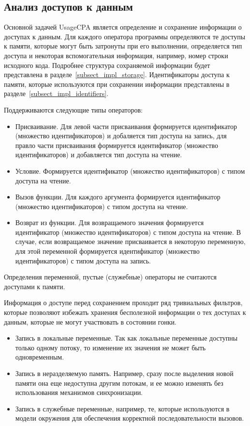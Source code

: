 \subsection{Анализ доступов к данным}
Основной задачей UsageCPA является определение и сохранение информации о доступах к данным. 
Для каждого оператора программы определяются те доступы к памяти, которые могут быть затронуты при его выполнении, определяется тип доступа и некоторая вспомогательная информация, например, номер строки исходного кода.
Подробнее структура сохраняемой информации будет представлена в разделе~\ref{subsect_impl_storage}.
Идентификаторы доступа к памяти, которые используются при сохранении информации представлены в разделе~\ref{subsect_impl_identifiers}.

Поддерживаются следующие типы операторов:
\begin{itemize}
\item Присваивание. Для левой части присваивания формируется идентификатор (множество идентификаторов) и добаляется тип доступа на запись, для правло части присваивания формируется идентификатор (множество идентификаторов) и добавляется тип доступа на чтение.
\item Условие. Формируется идентификатор (множество идентификаторов) с типом доступа на чтение.
\item Вызов функции. Для каждого аргумента формируется идентификатор (множество идентификаторов) с типом доступа на чтение.
\item Возврат из функции. Для возвращаемого значения формируется идентификатор (множество идентификаторов) с типом доступа на чтение. В случае, если возвращаемое значение присваивается в некоторую переменную, для этой переменной формируется идентификатор (множество идентификаторов) с типом доступа на запись.
\end{itemize}
Определения переменной, пустые (служебные) операторы не считаются доступами к памяти.

Информация о доступе перед сохранением проходит ряд тривиальных фильтров, которые позволяют избежать хранения бесполезной информации о тех доступах к данным, которые не могут участвовать в состоянии гонки.

\begin{itemize}
\item Запись в локальные переменные. Так как локальные переменные доступны только одному потоку, то изменение их значения не может быть одновременным.
\item Запись в неразделяемую память. Например, сразу после выделения новой памяти она еще недоступна другим потокам, и ее можно изменять без использования механизмов синхронизации.
\item Запись в служебные переменные, например, те, которые используются в модели окружения для обеспечения корректной последовательности вызовов. 
\end{itemize}

